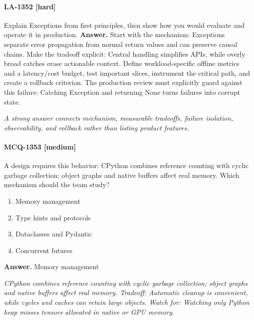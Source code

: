 \paragraph{LA-1352 [hard]} Explain Exceptions from first principles, then show how you would evaluate and operate it in production.
\noindent\textbf{Answer.} Start with the mechanism: Exceptions separate error propagation from normal return values and can preserve causal chains. Make the tradeoff explicit: Central handling simplifies APIs, while overly broad catches erase actionable context. Define workload-specific offline metrics and a latency/cost budget, test important slices, instrument the critical path, and create a rollback criterion. The production review must explicitly guard against this failure: Catching Exception and returning None turns failures into corrupt state.
\par\textit{A strong answer connects mechanism, measurable tradeoffs, failure isolation, observability, and rollback rather than listing product features.}
\paragraph{MCQ-1353 [medium]} A design requires this behavior: CPython combines reference counting with cyclic garbage collection; object graphs and native buffers affect real memory. Which mechanism should the team study?
\begin{enumerate}[label=\Alph*.]
\item Memory management
\item Type hints and protocols
\item Dataclasses and Pydantic
\item Concurrent futures
\end{enumerate}
\noindent\textbf{Answer.} Memory management
\par\textit{CPython combines reference counting with cyclic garbage collection; object graphs and native buffers affect real memory. Tradeoff: Automatic cleanup is convenient, while cycles and caches can retain large objects. Watch for: Watching only Python heap misses tensors allocated in native or GPU memory.}
